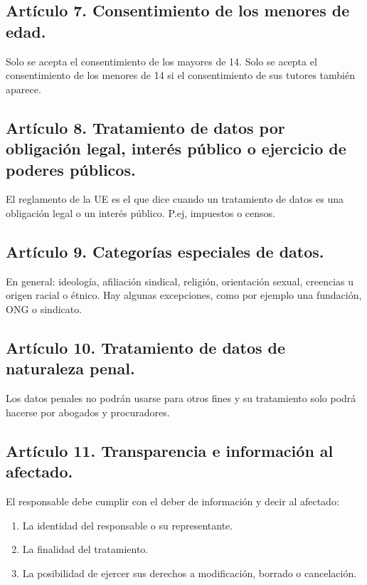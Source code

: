 \documentclass[letterpaper,10pt,spanish]{sphinxmanual}
\begin{document}
\subsection{Artículo 7. Consentimiento de los menores de edad.}
\label{\detokenize{tema_lopd/tema_lopd:articulo-7-consentimiento-de-los-menores-de-edad}}
Solo se acepta el consentimiento de los mayores de 14. Solo se acepta el consentimiento de los menores de 14 si el consentimiento de sus tutores también aparece.


\subsection{Artículo 8. Tratamiento de datos por obligación legal, interés público o ejercicio de poderes públicos.}
\label{\detokenize{tema_lopd/tema_lopd:articulo-8-tratamiento-de-datos-por-obligacion-legal-interes-publico-o-ejercicio-de-poderes-publicos}}
El reglamento de la UE es el que dice cuando un tratamiento de datos es una obligación legal o un interés público. P.ej, impuestos o censos.


\subsection{Artículo 9. Categorías especiales de datos.}
\label{\detokenize{tema_lopd/tema_lopd:articulo-9-categorias-especiales-de-datos}}
En general: ideología, afiliación sindical, religión, orientación sexual, creencias u origen racial o étnico. Hay algunas excepciones, como por ejemplo una fundación, ONG o sindicato.


\subsection{Artículo 10. Tratamiento de datos de naturaleza penal.}
\label{\detokenize{tema_lopd/tema_lopd:articulo-10-tratamiento-de-datos-de-naturaleza-penal}}
Los datos penales no podrán usarse para otros fines y su tratamiento solo podrá hacerse por abogados y procuradores.


\subsection{Artículo 11. Transparencia e información al afectado.}
\label{\detokenize{tema_lopd/tema_lopd:articulo-11-transparencia-e-informacion-al-afectado}}
El responsable debe cumplir con el deber de información y decir al afectado:
\begin{enumerate}
\def\theenumi{\arabic{enumi}}
\def\labelenumi{\theenumi .}
\makeatletter\def\p@enumii{\p@enumi \theenumi .}\makeatother
\item {} 
La identidad del responsable o su representante.

\item {} 
La finalidad del tratamiento.

\item {} 
La posibilidad de ejercer sus derechos a modificación, borrado o cancelación.

\end{enumerate}
\end{document}
